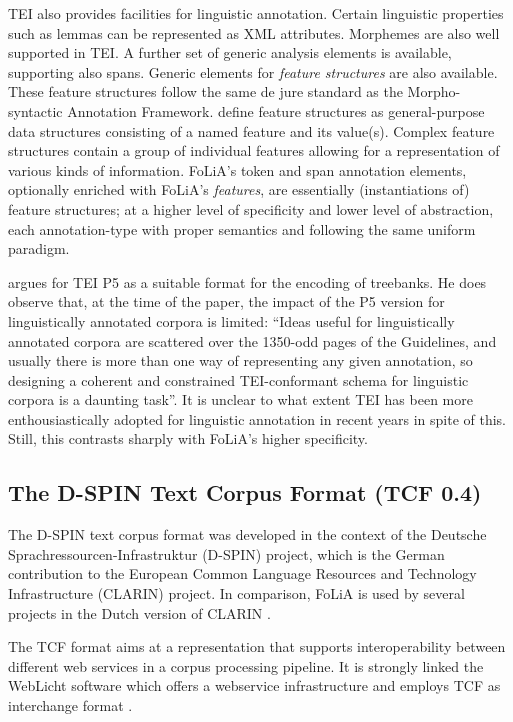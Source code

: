\documentclass[a4paper,10pt,twoside]{article}
\begin{document}
TEI also provides facilities for linguistic annotation. Certain
linguistic properties such as lemmas can be represented as XML attributes.
Morphemes are also well supported in TEI. A further set of generic analysis
elements is available, supporting also spans. Generic elements for
\emph{feature structures} are also available. These feature structures follow
the same de jure standard as the Morpho-syntactic Annotation Framework.  define
feature structures as general-purpose data structures consisting of a named
feature and its value(s). Complex feature structures contain a group of
individual features allowing for a representation of various kinds of
information. FoLiA's token and span annotation elements, optionally enriched
with FoLiA's \emph{features}, are essentially (instantiations of) feature structures;
at a higher level of specificity and lower level of abstraction, each
annotation-type with proper semantics and following the same uniform paradigm.

 argues for TEI P5 as a suitable format for the encoding of
treebanks. He does observe that, at the time of the paper, the impact of the P5
version for linguistically annotated corpora is limited: ``Ideas useful for
linguistically annotated corpora are scattered over the 1350-odd pages of the
Guidelines, and usually there is more than one way of representing any given
annotation, so designing a coherent and constrained TEI-conformant schema for
linguistic corpora is a daunting task''.  It is unclear to what extent TEI has
been more enthousiastically adopted for linguistic annotation in recent years
in spite of this. Still, this contrasts sharply with FoLiA's higher
specificity.


\subsection{The D-SPIN Text Corpus Format (TCF 0.4)}

The D-SPIN text corpus format \cite{TCF} was developed in the context of the
Deutsche Sprachressourcen-Infrastruktur (D-SPIN) project, which is the
German contribution to the European Common Language Resources and Technology
Infrastructure (CLARIN) project. In comparison, FoLiA is used by several
projects in the Dutch version of CLARIN \cite{CLARINNL}.

The TCF format aims at a representation that supports interoperability between
different web services in a corpus processing pipeline. It is strongly linked
the WebLicht software which offers a webservice infrastructure and employs
TCF as interchange format \cite{WEBLICHT}.
\end{document}
